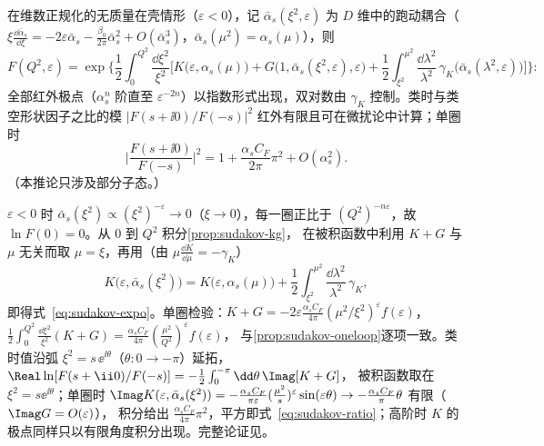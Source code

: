 \begin{corollary}\label{cor:sudakov-exponentiation}
在维数正规化的无质量在壳情形（$\varepsilon<0$），记 $\bar\alpha_s(\xi^2,\varepsilon)$ 为 $D$ 维中的跑动耦合（$\xi\frac{\dd\bar\alpha_s}{\dd\xi}=-2\varepsilon\bar\alpha_s-\frac{\beta_0}{2\pi}\bar\alpha_s^2+O(\bar\alpha_s^3)$，$\bar\alpha_s(\mu^2)=\alpha_s(\mu)$），则
\begin{equation}\label{eq:sudakov-expo}
F(Q^2,\varepsilon)=\exp\Big\{\frac12\int_0^{Q^2}\frac{\dd\xi^2}{\xi^2}\Big[K\big(\varepsilon,\alpha_s(\mu)\big)+G\big(1,\bar\alpha_s(\xi^2,\varepsilon),\varepsilon\big)
+\frac12\int_{\xi^2}^{\mu^2}\frac{\dd\lambda^2}{\lambda^2}\,\gamma_K\big(\bar\alpha_s(\lambda^2,\varepsilon)\big)\Big]\Big\}:
\end{equation}
全部红外极点（$\alpha_s^n$ 阶直至 $\varepsilon^{-2n}$）以指数形式出现，双对数由 $\gamma_K$ 控制。类时与类空形状因子之比的模
$|F(s+\ii0)/F(-s)|^2$ 红外有限且可在微扰论中计算\cite{Magnea:1990zb}；单圈时
\begin{equation}\label{eq:sudakov-ratio}
\Big|\frac{F(s+\ii0)}{F(-s)}\Big|^2=1+\frac{\alpha_sC_F}{2\pi}\pi^2+O(\alpha_s^2).
\end{equation}
（本推论只涉及部分子态。）
\end{corollary}

\begin{proofsketch}
$\varepsilon<0$ 时 $\bar\alpha_s(\xi^2)\propto(\xi^2)^{-\varepsilon}\to0$（$\xi\to0$），每一圈正比于 $(Q^2)^{-n\varepsilon}$，故 $\ln F(0)=0$。从 $0$ 到 $Q^2$ 积分\cref{prop:sudakov-kg}，
在被积函数中利用 $K+G$ 与 $\mu$ 无关而取 $\mu=\xi$，再用（由 $\mu\frac{\dd K}{\dd\mu}=-\gamma_K$）
\[
K\big(\varepsilon,\bar\alpha_s(\xi^2)\big)=K\big(\varepsilon,\alpha_s(\mu)\big)+\frac12\int_{\xi^2}^{\mu^2}\frac{\dd\lambda^2}{\lambda^2}\,\gamma_K ,
\]
即得式~\eqref{eq:sudakov-expo}。单圈检验：$K+G=-2\varepsilon\frac{\alpha_sC_F}{4\pi}(\mu^2/\xi^2)^\varepsilon f(\varepsilon)$，$\frac12\int_0^{Q^2}\frac{\dd\xi^2}{\xi^2}(K+G)=\frac{\alpha_sC_F}{4\pi}(\frac{\mu^2}{Q^2})^\varepsilon f(\varepsilon)$，
与\cref{prop:sudakov-oneloop}逐项一致。类时值沿弧 $\xi^2=s\,\ee^{\ii\theta}$（$\theta:0\to-\pi$）延拓，$\Real\ln[F(s+\ii0)/F(-s)]=-\frac12\int_0^{-\pi}\dd\theta\,\Imag[K+G]$，
被积函数取在 $\xi^2=s\ee^{\ii\theta}$；单圈时 $\Imag K(\varepsilon,\bar\alpha_s(\xi^2))=-\frac{\alpha_sC_F}{\pi\varepsilon}(\frac{\mu^2}{s})^\varepsilon\sin(\varepsilon\theta)\to-\frac{\alpha_sC_F}\pi\theta$ 有限（$\Imag G=O(\varepsilon)$），
积分给出 $\frac{\alpha_sC_F}{4\pi}\pi^2$，平方即式~\eqref{eq:sudakov-ratio}；高阶时 $K$ 的极点同样只以有限角度积分出现。完整论证见\cite{Magnea:1990zb}。%
\end{proofsketch}

